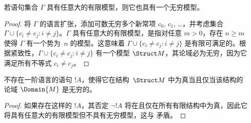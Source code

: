 \documentclass[../../../include/open-logic-section]{subfiles}
\begin{document}

\begin{thm}
 若语句集合 $\Gamma$ 具有任意大的有限模型，则它也具有一个无穷模型。
\end{thm}

\begin{proof}
将 $\Gamma$ 的语言扩张，添加可数无穷多个新常项 $c_0$, $c_1$, \dots，并考虑集合 $\Gamma \cup \{c_i \neq c_j :
i \neq j\}$。$\Gamma$ 具有任意大的有限模型，是指对任意 $m >0$，存在 $n\ge m$ 使得 $\Gamma$ 有一个势为~$n$ 的模型。这意味着 $\Gamma \cup \{c_i \neq
c_j : i \neq j\}$ 是有限可满足的。根据紧致性，$\Gamma
\cup \{c_i \neq c_j : i \neq j\}$ 有一个模型 $\Struct M$，其论域必为无穷，因为它满足所有不等式 $c_i \neq c_j$。
\end{proof}

\begin{prop}
不存在一阶语言的语句 $!A$，使得它在结构~$\Struct M$ 中为真当且仅当该结构的论域 $\Domain{M}$ 是无穷的。
\end{prop}

\begin{proof}
如果存在这样的 $!A$，其否定 $\lnot !A$ 将在且仅在所有有限结构中为真，因此它将具有任意大的有限模型但不具有无穷模型，这与  矛盾。
\end{proof}
\end{document}
